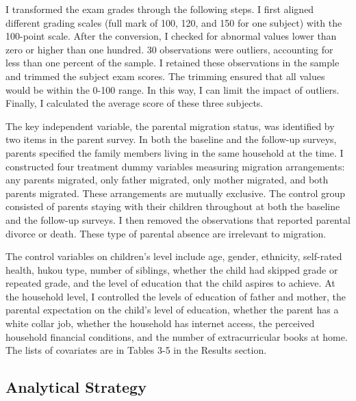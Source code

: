 \documentclass[
  man,floatsintext]{apa7}
\begin{document}
I transformed the exam grades through the following steps. I first aligned different grading scales (full mark of 100, 120, and 150 for one subject) with the 100-point scale. After the conversion, I checked for abnormal values lower than zero or higher than one hundred. 30 observations were outliers, accounting for less than one percent of the sample. I retained these observations in the sample and trimmed the subject exam scores. The trimming ensured that all values would be within the 0-100 range. In this way, I can limit the impact of outliers. Finally, I calculated the average score of these three subjects.

The key independent variable, the parental migration status, was identified by two items in the parent survey. In both the baseline and the follow-up surveys, parents specified the family members living in the same household at the time. I constructed four treatment dummy variables measuring migration arrangements: any parents migrated, only father migrated, only mother migrated, and both parents migrated. These arrangements are mutually exclusive. The control group consisted of parents staying with their children throughout at both the baseline and the follow-up surveys. I then removed the observations that reported parental divorce or death. These type of parental absence are irrelevant to migration.

The control variables on children's level include age, gender, ethnicity, self-rated health, hukou type, number of siblings, whether the child had skipped grade or repeated grade, and the level of education that the child aspires to achieve. At the household level, I controlled the levels of education of father and mother, the parental expectation on the child's level of education, whether the parent has a white collar job, whether the household has internet access, the perceived household financial conditions, and the number of extracurricular books at home. The lists of covariates are in Tables 3-5 in the Results section.

\hypertarget{analytical-strategy}{%
\subsection{Analytical Strategy}\label{analytical-strategy}}
\end{document}
